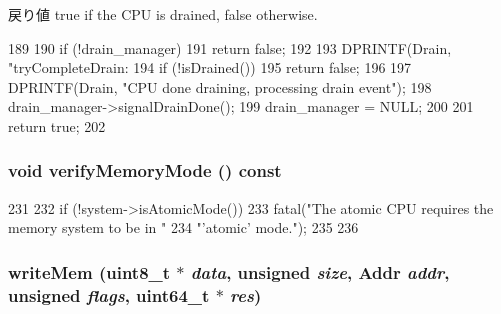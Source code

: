 \begin{DoxyReturn}{戻り値}
true if the CPU is drained, false otherwise. 
\end{DoxyReturn}



\begin{DoxyCode}
189 {
190     if (!drain_manager)
191         return false;
192 
193     DPRINTF(Drain, "tryCompleteDrain: %
194     if (!isDrained())
195         return false;
196 
197     DPRINTF(Drain, "CPU done draining, processing drain event\n");
198     drain_manager->signalDrainDone();
199     drain_manager = NULL;
200 
201     return true;
202 }
\end{DoxyCode}
\hypertarget{classAtomicSimpleCPU_ae2e1ccebe596a180f8105d57f9a93645}{
\subsubsection[{verifyMemoryMode}]{\setlength{\rightskip}{0pt plus 5cm}void verifyMemoryMode () const}}
\label{classAtomicSimpleCPU_ae2e1ccebe596a180f8105d57f9a93645}



\begin{DoxyCode}
231 {
232     if (!system->isAtomicMode()) {
233         fatal("The atomic CPU requires the memory system to be in "
234               "'atomic' mode.\n");
235     }
236 }
\end{DoxyCode}
\hypertarget{classAtomicSimpleCPU_ad46c5edeb1ee9b60445f3e26364e2c5e}{
\subsubsection[{writeMem}]{ writeMem (uint8\_\-t $\ast$ {\em data}, \/  unsigned {\em size}, \/  {\bf Addr} {\em addr}, \/  unsigned {\em flags}, \/  uint64\_\-t $\ast$ {\em res})}}
\label{classAtomicSimpleCPU_ad46c5edeb1ee9b60445f3e26364e2c5e}



